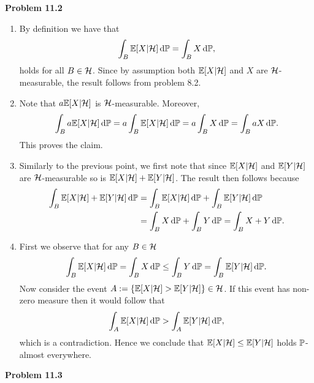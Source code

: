 \documentclass{lecturenotes}
\begin{document}
\textbf{Problem 11.2}

\begin{enumerate}[label={(\alph*)}]
\item By definition we have that
\[
	\int_B \mathbb E[X | \mathcal H] \, \mathrm{d} \mathbb P = \int_B X \, \mathrm{d} \mathbb P,
\]
holds for all $B \in \mathcal H$. Since by assumption both $\mathbb E[X | \mathcal H]$ and $X$ are $\mathcal H$-measurable, the result follows from problem 8.2.
\item Note that $a \mathbb E[X | \mathcal H]$ is $\mathcal H$-measurable. Moreover,
\[
	\int_B a \mathbb E[X | \mathcal H] \, \mathrm{d} \mathbb P = a \int_B \mathbb E[X | \mathcal H] \, \mathrm{d} \mathbb P = a \int_B X \, \mathrm{d} \mathbb P = \int_B aX \, \mathrm{d} \mathbb P.
\]
This proves the claim.
\item Similarly to the previous point, we first note that since $\mathbb E[X | \mathcal H]$ and $\mathbb E[Y | \mathcal H]$ are $\mathcal H$-measurable so is $\mathbb E[X | \mathcal H] + \mathbb E[Y | \mathcal H]$. The result then follows because
\begin{align*}
	\int_B \mathbb E[X | \mathcal H] + \mathbb E[Y | \mathcal H] \, \mathrm{d} \mathbb P 
	&= \int_B \mathbb E[X | \mathcal H] \, \mathrm{d} \mathbb P + \int_B \mathbb E[Y | \mathcal H] \, \mathrm{d} \mathbb P \\
	&= \int_B X \, \mathrm{d} \mathbb P + \int_B Y \, \mathrm{d} \mathbb P = \int_B X + Y \, \mathrm{d} \mathbb P.
\end{align*}
\item First we observe that for any $B \in \mathcal H$
\[
	\int_B \mathbb E[X | \mathcal H] \, \mathrm{d} \mathbb P = \int_B X \, \mathrm{d} \mathbb P \le \int_B Y \, \mathrm{d} \mathbb P = \int_B \mathbb E[Y | \mathcal H] \, \mathrm{d} \mathbb P.
\]
Now consider the event $A := \{ \mathbb E[X | \mathcal H] > \mathbb E[Y | \mathcal H]\} \in \mathcal H$. If this event has non-zero measure then it would follow that
\[
	\int_A \mathbb E[X | \mathcal H] \, \mathrm{d} \mathbb P > \int_A \mathbb E[Y | \mathcal H] \, \mathrm{d} \mathbb P,
\]
which is a contradiction. Hence we conclude that $\mathbb E[X | \mathcal H] \le \mathbb E[Y | \mathcal H]$ holds $\mathbb P$-almost everywhere.
\end{enumerate}

\textbf{Problem 11.3}
\end{document}
